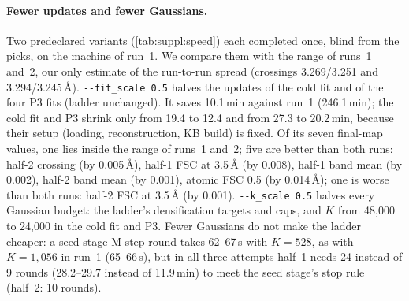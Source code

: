 \paragraph{Fewer updates and fewer Gaussians.}
Two predeclared variants (\cref{tab:suppl:speed}) each completed once, blind from the picks, on the machine of run~1. We compare them with the range of runs~1 and~2, our only estimate of the run-to-run spread (crossings 3.269/3.251 and 3.294/3.245\,\AA).
\texttt{-{}-fit\_scale 0.5} halves the updates of the cold fit and of the four P3 fits (ladder unchanged). It saves 10.1\,min against run~1 (246.1\,min); the cold fit and P3 shrink only from 19.4 to 12.4 and from 27.3 to 20.2\,min, because their setup (loading, reconstruction, KB build) is fixed.
Of its seven final-map values, one lies inside the range of runs~1 and~2; five are better than both runs: half-2 crossing (by 0.005\,\AA), half-1 FSC at 3.5\,\AA{} (by 0.008), half-1 band mean (by 0.002), half-2 band mean (by 0.001), atomic FSC 0.5 (by 0.014\,\AA); one is worse than both runs: half-2 FSC at 3.5\,\AA{} (by 0.001).
\texttt{-{}-k\_scale 0.5} halves every Gaussian budget: the ladder's densification targets and caps, and $K$ from 48{,}000 to 24{,}000 in the cold fit and P3.
Fewer Gaussians do not make the ladder cheaper: a seed-stage M-step round takes 62--67\,s with $K=528$, as with $K=1{,}056$ in run~1 (65--66\,s), but in all three attempts half~1 needs 24 instead of 9 rounds (28.2--29.7 instead of 11.9\,min) to meet the seed stage's stop rule (half~2: 10 rounds).
